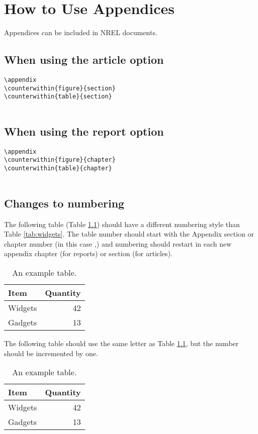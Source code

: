 \chapter{How to Use Appendices}
Appendices can be included in NREL documents.

\section{When using the article option}
\begin{lstlisting}
\appendix
\counterwithin{figure}{section}
\counterwithin{table}{section}


\end{lstlisting}

\section{When using the report option}
\begin{lstlisting}
\appendix
\counterwithin{figure}{chapter}
\counterwithin{table}{chapter}


\end{lstlisting}

\section{Changes to numbering}
The following table (Table \ref{tab:AppAWidgets}) should have a different numbering style than Table \ref{tab:widgets}. The table number should start with the Appendix section or chapter number (in this case \thechapter,) and numbering should restart in each new appendix chapter (for reports) or section (for articles).

\begin{table}[!h]
\centering
\caption{An example table.}\label{tab:AppAWidgets}
\begin{tabular}{lr}
Item & Quantity \\
\hline
Widgets & 42 \\
Gadgets & 13
\end{tabular}
\end{table}

The following table should use the same letter as Table \ref{tab:AppAWidgets}, but the number should be incremented by one.

\begin{table}[!h]
\centering
\caption{An example table.}\label{tab:AppAWidgetsTwo}
\begin{tabular}{lr}
Item & Quantity \\
\hline
Widgets & 42 \\
Gadgets & 13
\end{tabular}
\end{table}